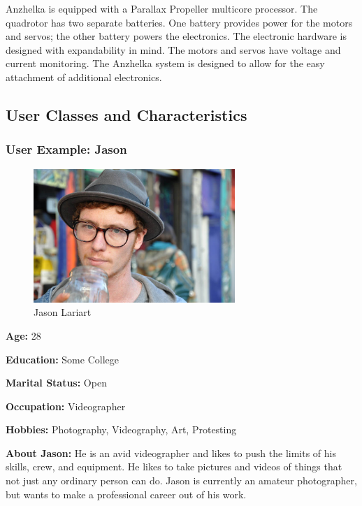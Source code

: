 \documentclass[english]{article}
\numberwithin{equation}{section} %
\begin{document}
Anzhelka is equipped with a Parallax Propeller multicore processor. The quadrotor has two separate batteries. One battery provides power for the motors and servos; the other battery powers the electronics. The electronic hardware is designed with expandability in mind. The motors and servos have voltage and current monitoring. The Anzhelka system is designed to allow for the easy attachment of additional electronics.

\subsection{User Classes and Characteristics}

\subsubsection{User Example: Jason}

\begin{figure}[h!]
  \centering
	\includegraphics[width=3in]{hipster1.jpg}
  \caption{Jason Lariart}
\end{figure}

\textbf{ Age:} 28

\textbf{ Education:} Some College

\textbf{ Marital Status:} Open

\textbf{ Occupation:} Videographer

\textbf{ Hobbies:} Photography, Videography, Art, Protesting

\textbf{About Jason:} He is an avid videographer and likes to push the limits of his skills, crew, and equipment. He likes to take pictures and videos of things that not just any ordinary person can do. Jason is currently an amateur photographer, but wants to make a professional career out of his work.
\\
\end{document}
